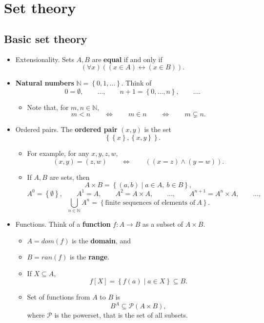 \documentclass{article}
\newcommand{\N}{\mathbb{N}}
\newcommand{\rb}[1]{\left( #1 \right)}
\renewcommand{\sb}[1]{\left[ #1 \right]}
\newcommand{\cb}[1]{\left\{ #1 \right\}}
\newcommand{\andb}[2]{\rb{#1 \land #2}}
\newcommand{\iffb}[2]{\rb{#1 \leftrightarrow #2}}
\newcommand{\fab}[1]{\rb{\forall #1}}
\newcommand{\eqb}[2]{\rb{#1 = #2}}
\newcommand{\inb}[2]{\rb{#1 \in #2}}
\theoremstyle{definition}\newtheorem{definition}{Definition}[subsection]
\theoremstyle{definition}\newtheorem{remark1}[definition]{Remark}
\theoremstyle{definition}\newtheorem{example1}[definition]{Example}
\theoremstyle{definition}\newtheorem*{remark2}{Remark}
\theoremstyle{definition}\newtheorem*{example2}{Example}
\theoremstyle{definition}\newtheorem*{note}{Note}
\theoremstyle{definition}\newtheorem*{notation}{Notation}
\begin{document}
\pagebreak

\section{Set theory}

\setcounter{subsection}{-1}

\subsection{Basic set theory}

\begin{itemize}
\item Extensionality. Sets $ A, B $ are \textbf{equal} if and only if
$$ \fab{x}\iffb{\inb{x}{A}}{\inb{x}{B}}. $$
\item \textbf{Natural numbers} $ \N = \cb{0, 1, \dots} $. Think of
$$ 0 = \emptyset, \qquad \dots, \qquad n + 1 = \cb{0, \dots, n}, \qquad \dots. $$
\begin{itemize}
\item Note that, for $ m, n \in \N $,
$$ m < n \qquad \iff \qquad m \in n \qquad \iff \qquad m \subsetneq n. $$
\end{itemize}
\item Ordered pairs. The \textbf{ordered pair} $ \rb{x, y} $ is the set
$$ \cb{\cb{x}, \cb{x, y}}. $$
\begin{itemize}
\item For example, for any $ x, y, z, w $,
$$ \rb{x, y} = \rb{z, w} \qquad \iff \qquad \andb{\eqb{x}{z}}{\eqb{y}{w}}. $$
\item If $ A, B $ are sets, then
$$ A \times B = \cb{\rb{a, b} \mid a \in A, \ b \in B}, $$
$$ A^0 = \cb{\emptyset}, \qquad A^1 = A, \qquad A^2 = A \times A, \qquad \dots, \qquad A^{n + 1} = A^n \times A, \qquad \dots, $$
$$ \bigcup_{n \in \N} A^n = \cb{\text{finite sequences of elements of} \ A}. $$
\end{itemize}
\item Functions. Think of a \textbf{function} $ f : A \to B $ as a subset of $ A \times B $.
\begin{itemize}
\item $ A = dom\rb{f} $ is the \textbf{domain}, and
\item $ B = ran\rb{f} $ is the \textbf{range}.
\item If $ X \subseteq A $,
$$ f\sb{X} = \cb{f\rb{a} \mid a \in X} \subseteq B. $$
\item Set of functions from $ A $ to $ B $ is
$$ B^A \subseteq \mathcal{P}\rb{A \times B}, $$
where $ \mathcal{P} $ is the powerset, that is the set of all subsets.
\end{itemize}
\end{itemize}
\end{document}
